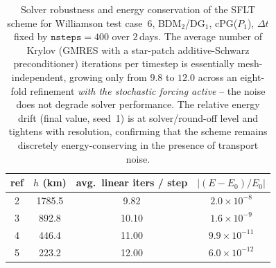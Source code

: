 \begin{table}[htbp]
  \centering
  \begin{tabular}{c c c c}
    \toprule
    ref & $h$ (km) & avg.\ linear iters / step & $|(E-E_0)/E_0|$ \\
    \midrule
    2 & 1785.5 &  9.82 & $2.0\times10^{-8}$  \\
    3 &  892.8 & 10.10 & $1.6\times10^{-9}$  \\
    4 &  446.4 & 11.00 & $9.9\times10^{-11}$ \\
    5 &  223.2 & 12.00 & $6.0\times10^{-12}$ \\
    \bottomrule
  \end{tabular}
  \caption{Solver robustness and energy conservation of the SFLT scheme for
    Williamson test case~6, BDM$_2$/DG$_1$, cPG($P_1$), $\Delta t$ fixed by
    $\texttt{nsteps}=400$ over $2$\,days. The average number of Krylov (GMRES with
    a star-patch additive-Schwarz preconditioner) iterations per timestep is
    essentially mesh-independent, growing only from $9.8$ to $12.0$ across an
    eight-fold refinement \emph{with the stochastic forcing active} -- the noise
    does not degrade solver performance. The relative energy drift (final value,
    seed~1) is at solver/round-off level and tightens with resolution, confirming
    that the scheme remains discretely energy-conserving in the presence of
    transport noise.}
  \label{tab:w6-sflt-robust}
\end{table}

